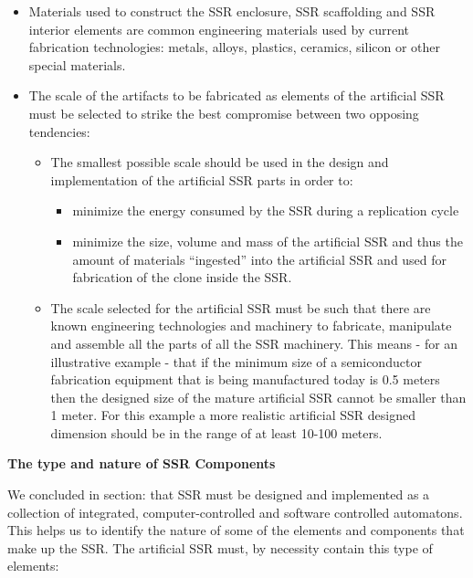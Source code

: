 \documentclass[letterpaper]{article}
\begin{document}
\bigskip

\begin{itemize}
\item Materials used to construct the SSR enclosure, SSR scaffolding and
SSR interior elements are common engineering materials used by current
fabrication technologies: metals, alloys, plastics, ceramics, silicon
or other special materials.
\item The scale of the artifacts to be fabricated as elements of the
artificial SSR must be selected to strike the best compromise between
two opposing tendencies:

\begin{itemize}
\item The smallest possible scale should be used in the design and
implementation of the artificial SSR parts in order to:

\begin{itemize}
\item minimize the energy consumed by the SSR during a replication cycle

\item minimize the size, volume and mass of the artificial SSR and thus
the amount of materials “ingested” into the artificial SSR and used for
fabrication of the clone inside the SSR.
\end{itemize}
\item The scale selected for the artificial SSR must be such that there
are known engineering technologies and machinery to fabricate,
manipulate and assemble all the parts of all the SSR machinery. This
means - for an illustrative example - that if the minimum size of a
semiconductor fabrication equipment that is being manufactured today is
0.5 meters then the designed size of the mature artificial SSR cannot
be smaller than 1 meter. For this example a more realistic artificial
SSR designed dimension should be in the range of at least 10-100
meters.
\end{itemize}
\end{itemize}

\bigskip


\bigskip


\bigskip

{\bfseries
\hypertarget{RefHeading3126306210128}{}The type and nature of SSR
Components}


\bigskip

We concluded in section:   that SSR must be designed and implemented as
a collection of integrated, computer-controlled and software controlled
automatons. This helps us to identify the nature of some of the
elements and components that make up the SSR. The artificial SSR must,
by necessity contain this type of elements:
\end{document}
